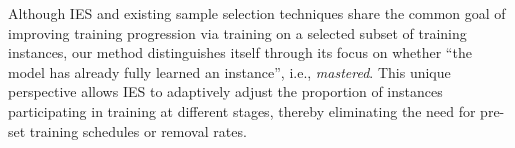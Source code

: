 Although IES and existing sample selection techniques share the common goal of improving training progression via training on a selected subset of training instances, our method distinguishes itself through its focus on whether ``the model has already fully learned an instance'', i.e., \emph{mastered}. This unique perspective allows IES to adaptively adjust the proportion of instances participating in training at different stages, thereby eliminating the need for pre-set training schedules or removal rates.